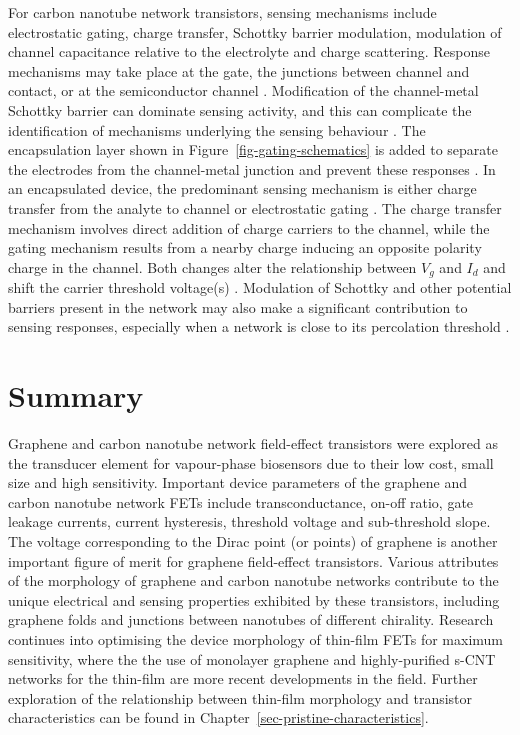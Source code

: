 \documentclass[
  a4paper,
]{scrbook}
\begin{document}
For carbon nanotube network transistors, sensing mechanisms include
electrostatic gating, charge transfer, Schottky barrier modulation,
modulation of channel capacitance relative to the electrolyte and charge
scattering. Response mechanisms may take place at the gate, the
junctions between channel and contact, or at the semiconductor channel
\autocite{Heller2008,Battie2011,Boyd2014,Tran2016,Li2023}. Modification
of the channel-metal Schottky barrier can dominate sensing activity, and
this can complicate the identification of mechanisms underlying the
sensing behaviour \autocite{Cao2009,Boyd2014,Schroeder2019}. The
encapsulation layer shown in Figure~\ref{fig-gating-schematics} is added
to separate the electrodes from the channel-metal junction and prevent
these responses \autocite{Heller2008,Shkodra2021}. In an encapsulated
device, the predominant sensing mechanism is either charge transfer from
the analyte to channel \autocite{Allen2007,Battie2011} or electrostatic
gating \autocite{Heller2008}. The charge transfer mechanism involves
direct addition of charge carriers to the channel, while the gating
mechanism results from a nearby charge inducing an opposite polarity
charge in the channel. Both changes alter the relationship between
\(V_g\) and \(I_d\) and shift the carrier threshold voltage(s)
\autocite{Tran2016,Shkodra2021,Li2023}. Modulation of Schottky and other
potential barriers present in the network may also make a significant
contribution to sensing responses, especially when a network is close to
its percolation threshold \autocite{Boyd2014,Murugathas2019}.

\hypertarget{summary}{%
\section{Summary}\label{summary}}

Graphene and carbon nanotube network field-effect transistors were
explored as the transducer element for vapour-phase biosensors due to
their low cost, small size and high sensitivity. Important device
parameters of the graphene and carbon nanotube network FETs include
transconductance, on-off ratio, gate leakage currents, current
hysteresis, threshold voltage and sub-threshold slope. The voltage
corresponding to the Dirac point (or points) of graphene is another
important figure of merit for graphene field-effect transistors. Various
attributes of the morphology of graphene and carbon nanotube networks
contribute to the unique electrical and sensing properties exhibited by
these transistors, including graphene folds and junctions between
nanotubes of different chirality. Research continues into optimising the
device morphology of thin-film FETs for maximum sensitivity, where the
the use of monolayer graphene and highly-purified s-CNT networks for the
thin-film are more recent developments in the field. Further exploration
of the relationship between thin-film morphology and transistor
characteristics can be found in
Chapter~\ref{sec-pristine-characteristics}.
\end{document}
